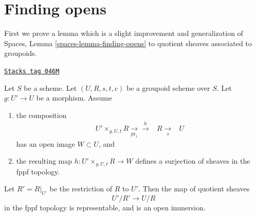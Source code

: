 \section{Finding opens}
\label{bootstrap-section-finding-opens}
\medskip\noindent
First we prove a lemma which is a slight improvement and generalization of
Spaces, Lemma \ref{spaces-lemma-finding-opens}
to quotient sheaves associated to groupoids.

\begin{lemma}
\label{bootstrap-lemma-better-finding-opens}
\href{https://stacks.math.columbia.edu/tag/046M}{\texttt{Stacks tag 046M}}

Let $S$ be a scheme.
Let $(U, R, s, t, c)$ be a groupoid scheme over $S$.
Let $g : U' \to U$ be a morphism.
Assume
\begin{enumerate}
\item the composition
$$
\begin{array}{ccc}U' \times_{g, U, t} R \underset{\text{pr}_1}{\longrightarrow}\overset{h}{\longrightarrow} & R \underset{s}{\longrightarrow} & U\end{array}
$$
has an open image $W \subset U$, and
\item the resulting map $h : U' \times_{g, U, t} R \to W$
defines a surjection of sheaves in the fppf topology.
\end{enumerate}
Let $R' = R|_{U'}$ be the restriction of $R$ to $U'$. Then the map
of quotient sheaves
$$
U'/R' \to U/R
$$
in the fppf topology is representable, and is an open immersion.
\end{lemma}


